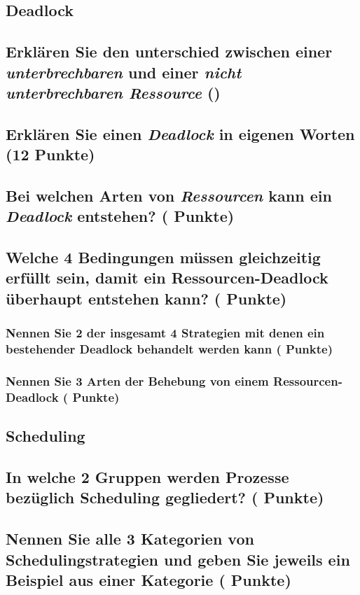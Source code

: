 \documentclass[9pt]{article}
\begin{document}
\bigskip
\begin{center}
  \begin{minipage}{0.9\linewidth}
    \section{Deadlock}
    \subsection{Erklären Sie den unterschied zwischen einer \textsl{unterbrechbaren} und einer \textsl{nicht unterbrechbaren Ressource} ()}
    \bigskip
    \bigskip
    \subsection{Erklären Sie einen \textsl{Deadlock} in eigenen Worten (12 Punkte)}
    \bigskip
    \bigskip
    \subsection{Bei welchen Arten von \textsl{Ressourcen} kann ein \textsl{Deadlock} entstehen? ( Punkte)}
    \bigskip
    \bigskip
    \subsection{Welche 4 Bedingungen müssen gleichzeitig erfüllt sein, damit ein Ressourcen-Deadlock überhaupt entstehen kann? ( Punkte)}
    \subsubsection{Nennen Sie 2 der insgesamt 4 Strategien mit denen ein bestehender Deadlock behandelt werden kann ( Punkte)}
    \subsubsection{Nennen Sie 3 Arten der Behebung von einem Ressourcen-Deadlock ( Punkte)}
    
  \end{minipage}
\end{center}

\begin{center}
  \begin{minipage}{0.9\linewidth}
    \section{Scheduling}
    \subsection{In welche 2 Gruppen werden Prozesse bezüglich Scheduling gegliedert? ( Punkte)}
    \subsection{Nennen Sie alle 3 Kategorien von Schedulingstrategien und geben Sie jeweils ein Beispiel aus einer Kategorie ( Punkte)}
    
  \end{minipage}
\end{center}
\end{document}
